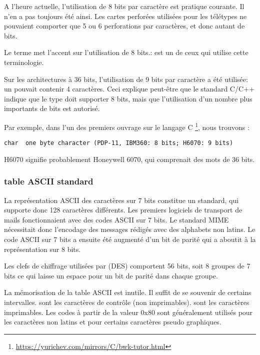 A l'heure actuelle, l'utilisation de 8 bits par caractère est pratique courante.
Il n'en a pas toujours été ainsi.
Les cartes perforées utilisées pour les télétypes ne pouvaient comporter que 5 ou 6 perforations par caractères, et donc autant de bits.

Le terme  met l'accent sur l'utilisation de 8 bits.:
 est un de ceux qui utilise cette terminologie.

Sur les architectures à 36 bits, l'utilisation de 9 bits par caractère a été utilisée: un  pouvait contenir 4 caractères.
Ceci explique peut-être que le standard C/C++ indique que le type  doit supporter  8 bits, mais que l'utilisation
d'un nombre plus importants de bits est autorisé.

Par exemple, dans l'un des premiers ouvrage sur le langage C \footnote{\url{https://yurichev.com/mirrors/C/bwk-tutor.html}}, nous trouvons :

\begin{lstlisting}
char  one byte character (PDP-11, IBM360: 8 bits; H6070: 9 bits)
\end{lstlisting}

H6070 signifie probablement Honeywell 6070, qui comprenait des mots de 36 bits.

\subsubsection{table ASCII standard}

La représentation ASCII des caractères sur 7 bits constitue un standard, qui supporte donc 128 caractères différents.
Les premiers logiciels de transport de mails fonctionnaient avec des codes ASCII sur 7 bits.
Le standard \ac{MIME} nécessitait donc l'encodage des messages rédigés avec des alphabets non latins.
Le code ASCII sur 7 bits a ensuite été augmenté d'un bit de parité qui a aboutit à la représentation sur 8 bits.

Les clefs de chiffrage utilisées par  (\ac{DES}) comportent 56 bits, soit 8 groupes de 7 bits
ce qui laisse un espace pour un bit de parité dans chaque groupe.

La mémorisation de la table \ac{ASCII} est inutile. Il suffit de se souvenir de certains intervalles.
 sont les caractères de contrôle (non imprimables).
 sont les caractères imprimables.
Les codes à partir de la valeur 0x80 sont généralement utilisés pour les caractères non latins et pour certains caractères pseudo graphiques.

